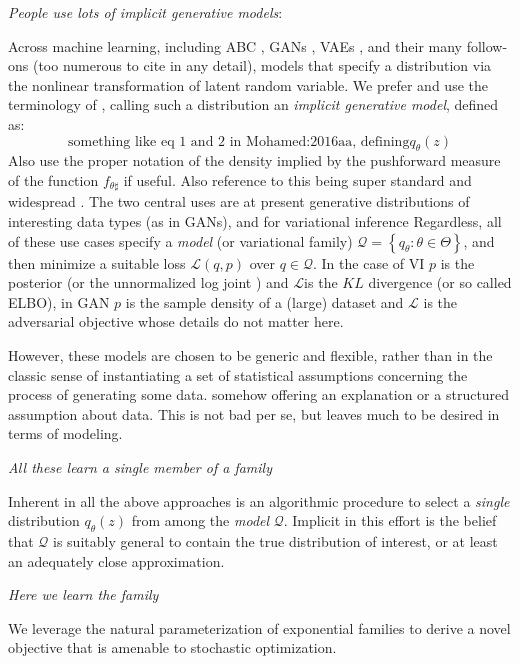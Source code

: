 \documentclass{article}
\begin{document}
  \emph{People use lots of implicit generative models}:
  
  Across machine learning, including ABC \cite{guttman2014statistical} , GANs \cite{Goodfellow:2014aa}, VAEs \cite{Kingma:2013aa, rezende2014stochastic}, and their many follow-ons (too numerous to cite in any detail), models that specify a distribution via the nonlinear transformation of latent random variable.  We prefer and use the terminology  of \cite{Mohamed:2016aa}, calling such a distribution an \emph{implicit generative model}, defined as:
   $$ \textrm{something like eq 1 and 2 in Mohamed:2016aa, defining}  q_\theta (z) $$
 Also use the proper notation of the density implied by the pushforward measure of the function $f_{\theta\sharp}$ if useful.  Also reference to this being super standard and widespread \cite{Devroye:1986aa}.
 The two central uses are at present generative distributions of interesting data types (as in GANs), and for variational inference
 Regardless, all of these use cases specify a \emph{model} (or variational family) $\mathcal{Q} = \left\{ q_\theta : \theta \in \Theta\right\}$, and then minimize a suitable loss $\mathcal{L}( q , p)$ over $q \in \mathcal{Q}$.   In the case of VI $p$ is the posterior (or the unnormalized log joint ) and $\mathcal{L}$is the $KL$ divergence (or so called ELBO), in GAN $p$ is the sample density of a (large) dataset and $\mathcal{L}$ is the adversarial objective whose details do not matter here.
 
 However, these models are chosen to be generic and flexible, rather than in the classic sense of instantiating a set of statistical assumptions concerning the process of generating some data.  somehow offering an explanation or a structured assumption about data.  This is not bad per se, but leaves much to be desired in terms of modeling.
 
 
 
 \emph{All these learn a single member of a family}
 
 Inherent in all the above approaches is an algorithmic procedure to select a \emph{single} distribution $q_\theta(z)$ from among the \emph{model} $\mathcal{Q}$.  Implicit in this effort is the belief that $\mathcal{Q}$ is suitably general to contain the true distribution of interest, or at least an adequately close approximation.
 
 \emph{Here we learn the family}
 
 We leverage the natural parameterization of exponential families to derive a novel objective that is amenable to stochastic optimization.
 
\end{document}
